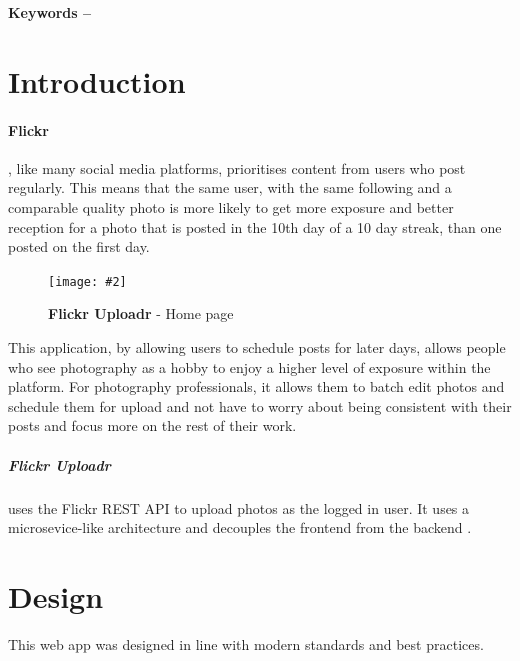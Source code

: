 \documentclass[10pt, a4paper]{article}
\title{\mytitle}
\author{\myauthor\hspace{1em}\\\contact\\Edinburgh Napier University\hspace{0.5em}-\hspace{0.5em}\mymodule}
\date{}
\newcommand{\figuremacro}[5]{
\begin{figure}[#1]
\centering
\texttt{[image: \#2]}
\caption[#3]{\textbf{#3}#4}
\label{fig:#2}
\end{figure}
}
\begin{document}
\maketitle
\begin{abstract}
        Flickr Uploadr is an application that allows users of the photography oriented platform Flickr to schedule photos to be uploaded at a later date. The users connect their flickr account to the app and can schedule photos to be uploaded and can change the title, description and tags of a photo.
        \end{abstract}

        \textbf{Keywords -- }{\mykeywords}

        \section{Introduction}
        \paragraph{Flickr \cite{Flickr}}, like many social media platforms, prioritises content from users who post regularly. This means that the same user, with the same following and a comparable quality photo is more likely to get more exposure and better reception for a photo that is posted in the 10th day of a 10 day streak, than one posted on the first day.

        \figuremacro{h}{home}{Flickr Uploadr}{ - Home page}{1.0}

        This application, by allowing users to schedule posts for later days, allows people who see photography as a hobby to enjoy a higher level of exposure within the platform. For photography professionals, it allows them to batch edit photos and schedule them for upload and not have to worry about being consistent with their posts and focus more on the rest of their work.

        \subparagraph{Flickr Uploadr} uses the Flickr REST API \cite{Flickr_Services} to upload photos as the logged in user.
        It uses a microsevice-like architecture and decouples the frontend from the backend \cite{Microservices_and_SPAs_2017}.

        \section{Design}
        This web app was designed in line with modern standards and best practices.
\end{document}
